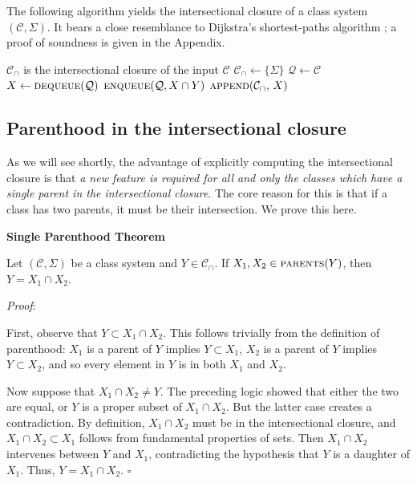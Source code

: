 \documentclass[11pt, oneside]{article}   	%
\begin{document}
The following algorithm yields the intersectional closure of a class system $(\mathcal C, \Sigma)$. It bears a close resemblance to Dijkstra's shortest-paths algorithm \cite{Dijkstra1959}; a proof of soundness is given in the Appendix.

\noindent \begin{algorithmic}
    \ENSURE $\mathcal C_\cap$ is the intersectional closure of the input $\mathcal C$
    \STATE
    \STATE $\mathcal C_\cap \leftarrow \{ \Sigma \} $
    \STATE $\mathcal Q \leftarrow \mathcal C$
    \STATE
        \STATE $X \leftarrow \textsc{dequeue}(\mathcal Q)$
                \STATE $\textsc{enqueue}(\mathcal Q, X \cap Y)$
            \ENDFOR
            \STATE $\textsc{append}(\mathcal C_\cap, \, X)$
        \ENDIF
    \ENDWHILE
\end{algorithmic}


\subsection{Parenthood in the intersectional closure}

As we will see shortly, the advantage of explicitly computing the intersectional closure is that \textit{a new feature is required for all and only the classes which have a single parent in the intersectional closure}. The core reason for this is that if a class has two parents, it must be their intersection. We prove this here.

\vspace{\baselineskip} \noindent \textbf{Single Parenthood Theorem}

Let $(\mathcal C, \Sigma)$ be a class system and $Y \in \mathcal C_\cap$. If $X_1, X_2 \in \textsc{parents}(Y)$, then $Y = X_1 \cap X_2$.

\vspace{\baselineskip} \noindent \textit{Proof}:

First, observe that $Y \subset X_1 \cap X_2$. This follows trivially from the definition of parenthood: $X_1$ is a parent of $Y$ implies $Y \subset X_1$, $X_2$ is a parent of $Y$ implies $Y \subset X_2$, and so every element in $Y$ is in both $X_1$ and $X_2$.

Now suppose that $X_1 \cap X_2 \neq Y$. The preceding logic showed that either the two are equal, or $Y$ is a proper subset of $X_1 \cap X_2$. But the latter case creates a contradiction. By definition, $X_1 \cap X_2$ must be in the intersectional closure, and $X_1 \cap X_2 \subset X_1$ follows from fundamental properties of sets. Then $X_1 \cap X_2$ intervenes between $Y$ and $X_1$, contradicting the hypothesis that $Y$ is a daughter of $X_1$. Thus, $Y = X_1 \cap X_2$. $\square$
	
\end{document}
